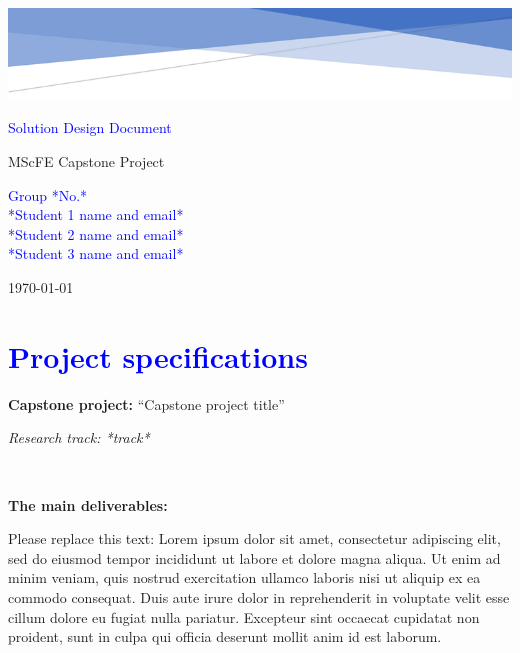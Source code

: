 \documentclass[a4paper, 11pt]{article}
\begin{document}
\begin{center}
    \vspace*{-3.9cm} \hspace*{-2.3cm} \includegraphics[width=20.6cm]{header.png}
\end{center}

\vspace*{11cm}
\begin{flushright}
    \Huge \textcolor{blue}{Solution Design Document}
    
    \vspace*{0.5cm} \Large MScFE Capstone Project
    
    \vspace*{1.5cm} \large 
    \textcolor{blue}{
        Group *No.* \\ 
        *Student 1 name and email* \\ 
        *Student 2 name and email* \\ 
        *Student 3 name and email* \\
    }
    
    \vspace*{0.5cm} \today
\end{flushright}
\vspace*{1cm} \newpage


\section*{\textcolor{blue}{Project specifications}}


\textbf{Capstone project:} “Capstone project title”

\hspace{3.8cm}\textit{Research track: *track*}


\ 

\textbf{The main deliverables:}

Please replace this text: Lorem ipsum dolor sit amet, consectetur adipiscing elit, sed do eiusmod tempor incididunt ut labore et dolore magna aliqua. Ut enim ad minim veniam, quis nostrud exercitation ullamco laboris nisi ut aliquip ex ea commodo consequat. Duis aute irure dolor in reprehenderit in voluptate velit esse cillum dolore eu fugiat nulla pariatur. Excepteur sint occaecat cupidatat non proident, sunt in culpa qui officia deserunt mollit anim id est laborum.
\end{document}
